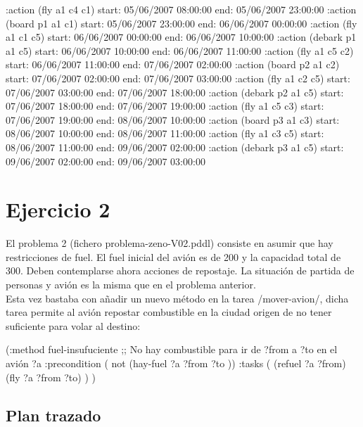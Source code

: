 \documentclass[	DIV=calc,%
							paper=a4,%
							fontsize=11pt]{scrartcl}	 					%
\newcommand{\miit}[1]{{\usefont{T1}{mdugm}{m}{it}\selectfont #1}}
\begin{document}
\begin{bashcode}
	:action (fly a1 c4 c1) start: 05/06/2007 08:00:00 end: 05/06/2007 23:00:00
	:action (board p1 a1 c1) start: 05/06/2007 23:00:00 end: 06/06/2007 00:00:00
	:action (fly a1 c1 c5) start: 06/06/2007 00:00:00 end: 06/06/2007 10:00:00
	:action (debark p1 a1 c5) start: 06/06/2007 10:00:00 end: 06/06/2007 11:00:00
	:action (fly a1 c5 c2) start: 06/06/2007 11:00:00 end: 07/06/2007 02:00:00
	:action (board p2 a1 c2) start: 07/06/2007 02:00:00 end: 07/06/2007 03:00:00
	:action (fly a1 c2 c5) start: 07/06/2007 03:00:00 end: 07/06/2007 18:00:00
	:action (debark p2 a1 c5) start: 07/06/2007 18:00:00 end: 07/06/2007 19:00:00
	:action (fly a1 c5 c3) start: 07/06/2007 19:00:00 end: 08/06/2007 10:00:00
	:action (board p3 a1 c3) start: 08/06/2007 10:00:00 end: 08/06/2007 11:00:00
	:action (fly a1 c3 c5) start: 08/06/2007 11:00:00 end: 09/06/2007 02:00:00
	:action (debark p3 a1 c5) start: 09/06/2007 02:00:00 end: 09/06/2007 03:00:00
\end{bashcode}


\section{Ejercicio 2}
\label{sec:Ejercicio 2}

\miit{El problema 2 (fichero problema-zeno-V02.pddl) consiste en asumir que hay restricciones de fuel. El fuel
inicial del avión es de 200 y la capacidad total de 300. Deben contemplarse ahora acciones de repostaje.
La situación de partida de personas y avión es la misma que en el problema anterior.}\\

Esta vez bastaba con añadir un nuevo método en la tarea \newlispinline/mover-avion/, dicha tarea permite al avión repostar combustible en la ciudad origen de no tener suficiente para volar al destino:
\begin{newlispcode}
  (:method fuel-insufuciente
    ;; No hay combustible para ir de ?from a ?to en el avión ?a
    :precondition ( not (hay-fuel ?a ?from ?to ))
    :tasks (
      (refuel ?a ?from)
      (fly ?a ?from ?to)
    )
  )
\end{newlispcode}

\subsection{Plan trazado}
\label{sub:Plan trazado}
\end{document}
